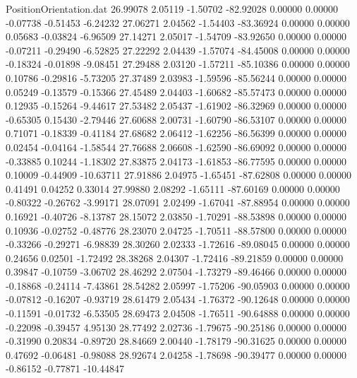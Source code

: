 \begin{filecontents}{PositionOrientation.dat}
  26.99078    2.05119   -1.50702   -82.92028    0.00000    0.00000   -0.07738   -0.51453   -6.24232
  27.06271    2.04562   -1.54403   -83.36924    0.00000    0.00000    0.05683   -0.03824   -6.96509
  27.14271    2.05017   -1.54709   -83.92650    0.00000    0.00000   -0.07211   -0.29490   -6.52825
  27.22292    2.04439   -1.57074   -84.45008    0.00000    0.00000   -0.18324   -0.01898   -9.08451
  27.29488    2.03120   -1.57211   -85.10386    0.00000    0.00000    0.10786   -0.29816   -5.73205
  27.37489    2.03983   -1.59596   -85.56244    0.00000    0.00000    0.05249   -0.13579   -0.15366
  27.45489    2.04403   -1.60682   -85.57473    0.00000    0.00000    0.12935   -0.15264   -9.44617
  27.53482    2.05437   -1.61902   -86.32969    0.00000    0.00000   -0.65305    0.15430   -2.79446
  27.60688    2.00731   -1.60790   -86.53107    0.00000    0.00000    0.71071   -0.18339   -0.41184
  27.68682    2.06412   -1.62256   -86.56399    0.00000    0.00000    0.02454   -0.04164   -1.58544
  27.76688    2.06608   -1.62590   -86.69092    0.00000    0.00000   -0.33885    0.10244   -1.18302
  27.83875    2.04173   -1.61853   -86.77595    0.00000    0.00000    0.10009   -0.44909  -10.63711
  27.91886    2.04975   -1.65451   -87.62808    0.00000    0.00000    0.41491    0.04252    0.33014
  27.99880    2.08292   -1.65111   -87.60169    0.00000    0.00000   -0.80322   -0.26762   -3.99171
  28.07091    2.02499   -1.67041   -87.88954    0.00000    0.00000    0.16921   -0.40726   -8.13787
  28.15072    2.03850   -1.70291   -88.53898    0.00000    0.00000    0.10936   -0.02752   -0.48776
  28.23070    2.04725   -1.70511   -88.57800    0.00000    0.00000   -0.33266   -0.29271   -6.98839
  28.30260    2.02333   -1.72616   -89.08045    0.00000    0.00000    0.24656    0.02501   -1.72492
  28.38268    2.04307   -1.72416   -89.21859    0.00000    0.00000    0.39847   -0.10759   -3.06702
  28.46292    2.07504   -1.73279   -89.46466    0.00000    0.00000   -0.18868   -0.24114   -7.43861
  28.54282    2.05997   -1.75206   -90.05903    0.00000    0.00000   -0.07812   -0.16207   -0.93719
  28.61479    2.05434   -1.76372   -90.12648    0.00000    0.00000   -0.11591   -0.01732   -6.53505
  28.69473    2.04508   -1.76511   -90.64888    0.00000    0.00000   -0.22098   -0.39457    4.95130
  28.77492    2.02736   -1.79675   -90.25186    0.00000    0.00000   -0.31990    0.20834   -0.89720
  28.84669    2.00440   -1.78179   -90.31625    0.00000    0.00000    0.47692   -0.06481   -0.98088
  28.92674    2.04258   -1.78698   -90.39477    0.00000    0.00000   -0.86152   -0.77871  -10.44847

\end{filecontents}
